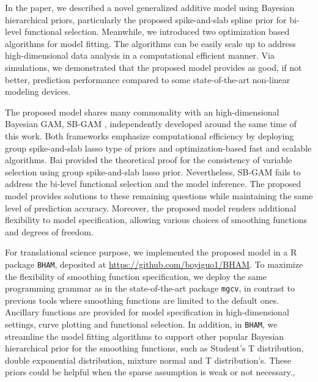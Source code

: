 \documentclass[AMA,STIX1COL,]{WileyNJD-v2}
\begin{document}
\label{sec:concl} In the paper, we described a novel generalized
additive model using Bayesian hierarchical priors, particularly the
proposed spike-and-slab spline prior for bi-level functional selection.
Meanwhile, we introduced two optimization based algorithms for model
fitting. The algorithms can be easily scale up to address
high-dimensional data analysis in a computational efficient manner. Via
simulations, we demonstrated that the proposed model provides as good,
if not better, prediction performance compared to some state-of-the-art
non-linear modeling devices.

The proposed model shares many commonality with an high-dimensional
Bayesian GAM, SB-GAM \citep{Bai2021}, independently developed around the
same time of this work. Both frameworks emphasize computational
efficiency by deploying group spike-and-slab lasso type of priors and
optimization-based fast and scalable algorithms. Bai provided the
theoretical proof for the consistency of variable selection using group
spike-and-slab lasso prior. Nevertheless, SB-GAM fails to address the
bi-level functional selection and the model inference. The proposed
model provides solutions to these remaining questions while maintaining
the same level of prediction accuracy. Moreover, the proposed model
renders additional flexibility to model specification, allowing various
choices of smoothing functions and degrees of freedom.

For translational science purpose, we implemented the proposed model in
a R package \texttt{BHAM}, deposited at
\url{https://github.com/boyiguo1/BHAM}. To maximize the flexibility of
smoothing function specification, we deploy the same programming grammar
as in the state-of-the-art package \texttt{mgcv}, in contrast to
previous tools where smoothing functions are limited to the default
ones. Ancillary functions are provided for model specification in
high-dimensional settings, curve plotting and functional selection. In
addition, in \texttt{BHAM}, we streamline the model fitting algorithms
to support other popular Bayesian hierarchical prior for the smoothing
functions, such as Student's T distribution, double exponential
distribution, mixture normal and T distribution's. These priors could be
helpful when the sparse assumption is weak or not necessary.,
\end{document}
